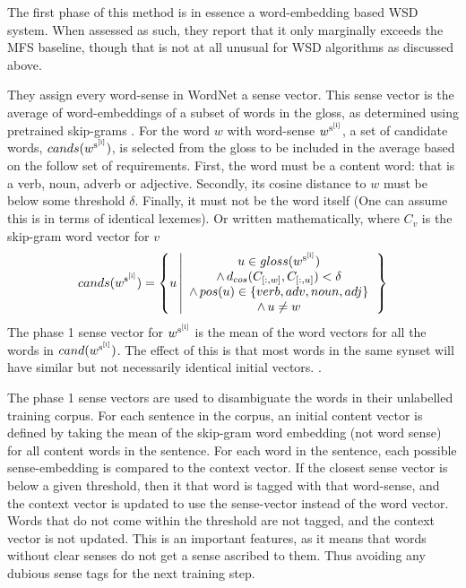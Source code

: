 \documentclass[12pt,parskip]{komatufte}
\begin{document}
The first phase of this method is in essence a word-embedding based WSD system.
When assessed as such, they report that it only marginally exceeds the MFS baseline,
though that is not at all unusual for WSD algorithms as discussed above.

They assign every word-sense in WordNet a sense vector.
This sense vector is the average of word-embeddings of a subset of words in the gloss,
as determined using pretrained skip-grams \parencite{mikolov2013efficient}.
For the word $w$ with word-sense $\d w_{\n s_i}$,
a set of candidate words, $cands(\d w_{\n s_i})$, is selected from the gloss to be included in the average
based on the follow set of requirements.
First, the word must be a content word: that is a verb, noun, adverb or adjective.
Secondly, its cosine distance to $w$ must be below some threshold $\delta$.
Finally, it must not be the word itself (One can assume this is in terms of identical lexemes).
Or written mathematically, where $C_v$ is the skip-gram word vector for $v$
\begin{equation}
cands(\d w_{\n s_{i}})=\left\{ u\left|\begin{array}{c}
u \in gloss(\d w_{\n s_{i}})\\
\wedge\, d_{cos}(\i C_w, \i C_u)<\delta\\
\wedge\, pos(u)\in\left\{ verb,adv,noun,adj\right\} \\
\wedge\, u\ne w
\end{array}\right.\right\} 
\end{equation}
The phase 1 sense vector for $\d w_{\n s_i}$ is the mean of the word vectors for all the words in $cand(\d w_{\n s_{i}})$.
The effect of this is that most words in the same synset will have similar but not necessarily identical initial vectors.
.

The phase 1 sense vectors are used to disambiguate the words in their unlabelled training corpus.
For each sentence in the corpus, an initial content vector is defined by taking the mean of the skip-gram word embedding (not word sense) for all content words in the sentence.
For each word in the sentence, each possible sense-embedding is compared to the context vector.
If the closest sense vector is below a given threshold,
then it that word is tagged with that word-sense, and the context vector is updated to use the sense-vector instead of the word vector.
Words that do not come within the threshold are not tagged, and the context vector is not updated.
This is an important features, as it means that words without clear senses do not get a sense ascribed to them.
Thus avoiding any dubious sense tags for the next training step.
\end{document}
